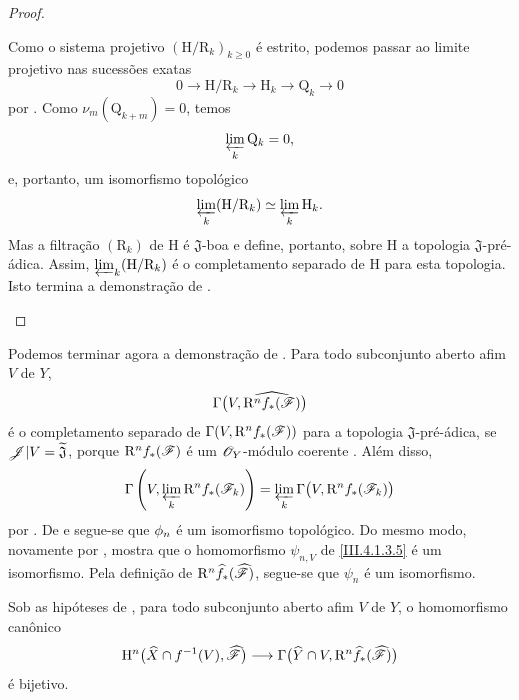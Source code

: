\begin{proof}
\begin{env}[4.1.7.21]
Como o sistema projetivo
$(\mathrm{H}/\mathrm{R}_k)_{k\geq0}$ é estrito, podemos passar ao
limite projetivo nas sucessões exatas
\[
  0
  \longrightarrow
  \mathrm{H}/\mathrm{R}_k
  \longrightarrow
  \mathrm{H}_k
  \longrightarrow
  \mathrm{Q}_k
  \longrightarrow
  0
  \tag{4.1.7.22}
  \label{III.4.1.7.22}
\]
por .
Como $\nu_m(\mathrm{Q}_{k+m})=0$, temos
\[
  \varprojlim_k\mathrm{Q}_k=0,
\]
e, portanto, um isomorfismo topológico
\[
  \varprojlim_k(\mathrm{H}/\mathrm{R}_k)
  \simeq
  \varprojlim_k\mathrm{H}_k.
\]
Mas a filtração $(\mathrm{R}_k)$ de $\mathrm{H}$ é
$\mathfrak{J}$-boa e define, portanto, sobre $\mathrm{H}$ a
topologia $\mathfrak{J}$-pré-ádica.
Assim, $\varprojlim_k(\mathrm{H}/\mathrm{R}_k)$ é o completamento
separado de $\mathrm{H}$ para esta topologia.
Isto termina a demonstração de .
\end{env}
\end{proof}

\begin{env}[4.1.8]
\label{III.4.1.8}
Podemos terminar agora a demonstração de .
Para todo subconjunto aberto afim $V$ de $Y$,
\[
  \Gamma\bigl(
    V,\widehat{\mathrm{R}^n f_*(\mathscr{F})}
  \bigr)
\]
é o completamento separado de
$\Gamma(V,\mathrm{R}^n f_*(\mathscr{F}))$ para a topologia
$\mathfrak{J}$-pré-ádica, se
$\mathscr{J}|V=\widetilde{\mathfrak{J}}$, porque
$\mathrm{R}^n f_*(\mathscr{F})$ é um $\mathscr{O}_Y$-módulo coerente
.
Além disso,
\[
  \Gamma\left(
    V,\varprojlim_k\mathrm{R}^n f_*(\mathscr{F}_k)
  \right)
  =
  \varprojlim_k
  \Gamma\bigl(V,\mathrm{R}^n f_*(\mathscr{F}_k)\bigr)
\]
por .
De  e  segue-se que
$\phi_n$ é um isomorfismo topológico.
Do mesmo modo, novamente por , 
mostra que o homomorfismo $\psi_{n,V}$ de \eqref{III.4.1.3.5} é um
isomorfismo.
Pela definição de
$\mathrm{R}^n\widehat{f}_*(\widehat{\mathscr{F}})$, segue-se que $\psi_n$ é um
isomorfismo.
\end{env}

\begin{corollary}[4.1.9]
\label{III.4.1.9}
Sob as hipóteses de , para todo subconjunto aberto
afim $V$ de $Y$, o homomorfismo canônico
\[
  \mathrm{H}^n\bigl(
    \widehat{X}\cap f^{-1}(V),
    \widehat{\mathscr{F}}
  \bigr)
  \longrightarrow
  \Gamma\bigl(
    \widehat{Y}\cap V,
    \mathrm{R}^n\widehat{f}_*(\widehat{\mathscr{F}})
  \bigr)
\]
é bijetivo.
\end{corollary}

